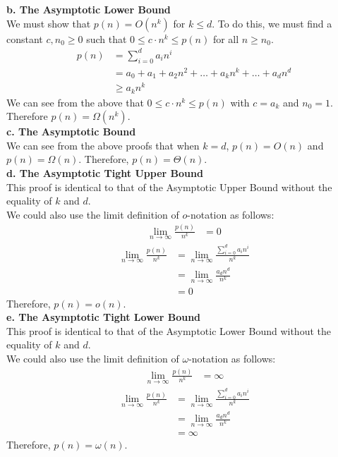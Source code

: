 \documentclass{article}
\begin{document}
{\noindent
\textbf{b. The Asymptotic Lower Bound} \\
We must show that $p(n) = O(n^k)$ for $k \leq d$. To do this, we must find a constant $c, n_{0} \geq 0$
such that $0 \leq c \cdot n^k \leq p(n)$ for all $n \geq n_{0}$. \\
\begin{align*}
  p(n) &= \sum_{i=0}^{d} a_{i}n^i \\
       &= a_{0} + a_{1} + a_2n^2 + \dots + a_kn^k + \dots + a_dn^d \\
       &\geq a_kn^k
\end{align*}
We can see from the above that $0 \leq c \cdot n^k \leq p(n)$ with $c = a_k$ and $n_0 = 1$. \\
Therefore $p(n) = \Omega(n^k)$. \\

\noindent
\textbf{c. The Asymptotic Bound} \\
We can see from the above proofs that when $k = d$, $p(n) = O(n)$ and $p(n) = \Omega(n)$.
Therefore, $p(n) = \Theta(n)$. \\

\noindent
\textbf{d. The Asymptotic Tight Upper Bound} \\
This proof is identical to that of the Asymptotic Upper Bound without the \\
equality of $k$ and $d$.\\
We could also use the limit definition of $o$-notation as follows: \\
\begin{align*}
  \lim_{n \to \infty} \frac{p(n)}{n^k} &= 0
\end{align*}
\begin{align*}
 \lim_{n \to \infty} \frac{p(n)}{n^k} &= \lim_{n \to \infty} \frac{\sum_{i=0}^{d} a_in^i}{n^k} \\
                                      &= \lim_{n \to \infty} \frac{a_{d}n^{d}}{n^k} \\
                                      &= 0
\end{align*}
Therefore, $p(n) = o(n)$.\\

\noindent
\textbf{e. The Asymptotic Tight Lower Bound} \\
This proof is identical to that of the Asymptotic Lower Bound without the \\
equality of $k$ and $d$.\\
We could also use the limit definition of $\omega$-notation as follows: \\
\begin{align*}
  \lim_{n \to \infty} \frac{p(n)}{n^k} &= \infty
\end{align*}
\begin{align*}
 \lim_{n \to \infty} \frac{p(n)}{n^k} &= \lim_{n \to \infty} \frac{\sum_{i=0}^{d} a_in^i}{n^k} \\
                                      &= \lim_{n \to \infty} \frac{a_{d}n^{d}}{n^k} \\
                                      &= \infty
\end{align*}
Therefore, $p(n) = \omega(n)$.

}
\end{document}
